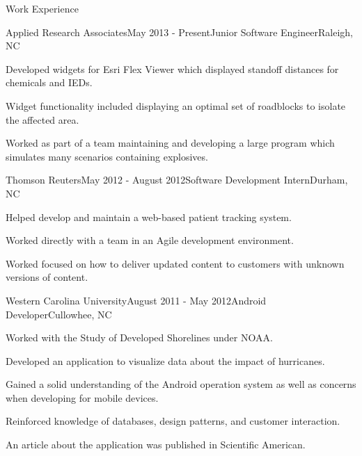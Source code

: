 \documentclass{resume} %
\begin{document}
\begin{rSection}{Work Experience}

\begin{rSubsection}{Applied Research Associates}{May 2013 - Present}{Junior Software Engineer}{Raleigh, NC}
\item Developed widgets for Esri Flex Viewer which displayed standoff distances for chemicals and IEDs.
\item Widget functionality included displaying an optimal set of roadblocks to isolate the affected area.
\item Worked as part of a team maintaining and developing a large program which simulates many scenarios containing explosives.
\end{rSubsection}

\begin{rSubsection}{Thomson Reuters}{May 2012 - August 2012}{Software Development Intern}{Durham, NC}
\item Helped develop and maintain a web-based patient tracking system.
\item Worked directly with a team in an Agile development environment.
\item Worked focused on how to deliver updated content to customers with unknown versions of content.
\end{rSubsection}




\begin{rSubsection}{Western Carolina University}{August 2011 - May 2012}{Android Developer}{Cullowhee, NC}
\item Worked with the Study of Developed Shorelines under NOAA.
\item Developed an application to visualize data about the impact of hurricanes.
\item Gained a solid understanding of the Android operation system as well as concerns when developing for mobile devices.
\item Reinforced knowledge of databases, design patterns, and customer interaction.
\item An article about the application was published in Scientific American. 
\end{rSubsection}
\end{rSection}


\end{document}
